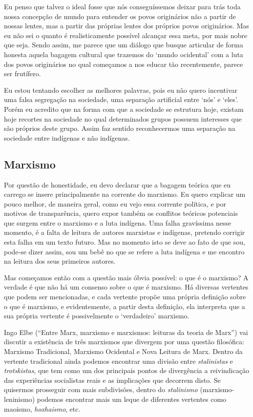 Eu penso que talvez o ideal fosse que nós conseguíssemos deixar para trás toda nossa concepção de mundo para entender os povos originários não a partir de nossas lentes, mas a partir das próprias lentes dos próprios povos originários. Mas eu não sei o quanto é realisticamente possível alcançar essa meta, por mais nobre que seja. Sendo assim, me parece que um diálogo que busque articular de forma honesta aquela bagagem cultural que trazemos do ‘mundo ocidental’ com a luta dos povos originários no qual começamos a nos educar tão recentemente, parece ser frutífero.

Eu estou tentando escolher as melhores palavras, pois eu não quero incentivar uma falsa segregação na sociedade, uma separação artificial entre ‘nós’ e ‘eles’. Porém eu acredito que na forma com que a sociedade se estrutura hoje, existam hoje recortes na sociedade no qual determinados grupos possuem interesses que são próprios deste grupo. Assim faz sentido reconhecermos uma separação na sociedade entre indígenas e não indígenas.


\subsection{Marxismo}

Por questão de honestidade, eu devo declarar que a bagagem teórica que eu carrego se insere principalmente na corrente do marxismo. Eu quero explicar um pouco melhor, de maneira geral, como eu vejo essa corrente política, e por motivos de transparência, quero expor também os conflitos teóricos potenciais que surgem entre o marxismo e a luta indígena. Uma falha gravíssima nesse momento, é a falta de leitura de autores marxistas e indígenas, pretendo corrigir esta falha em um texto futuro. Mas no momento isto se deve ao fato de que sou, pode-se dizer assim, sou um bebê no que se refere a luta indígena e me encontro na leitura dos seus primeiros autores.

Mas começamos então com a questão mais óbvia possível: o que é o marxismo? A verdade é que não há um consenso sobre o que é marxismo. Há diversas vertentes que podem ser mencionadas, e cada vertente propõe uma própria definição sobre o que é marxismo, e evidentemente, a partir desta definição, ela interpreta que a sua própria vertente é possivelmente o ‘verdadeiro’ marxismo.

Ingo Elbe (“Entre Marx, marxismo e marxismos: leituras da teoria de Marx”) vai discutir a existência de três marxismos que divergem por uma questão filosófica: Marxismo Tradicional, Marxismo Ocidental e Nova Leitura de Marx. Dentro da vertente tradicional ainda podemos encontrar uma divisão entre \textit{stalinistas} e \textit{trotskistas}, que tem como um dos principais pontos de divergência a reivindicação das experiências socialistas reais e as implicações que decorrem disto. Se quisermos prosseguir com mais subdivisões, dentro do \textit{stalinismo} (marxismo-leninismo) podemos encontrar mais um leque de diferentes vertentes como maoismo, \textit{hoxhaismo}, etc.

